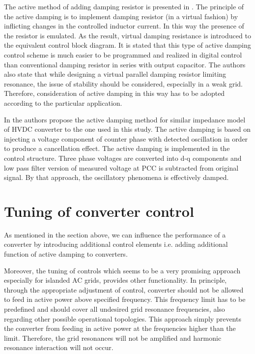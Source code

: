 \documentclass[a4paper,11pt,oneside]{report} %
\begin{document}
The active method of adding damping resistor is presented in \cite{chen2012}. The principle of the active damping is to implement damping resistor (in a virtual fashion) by inflicting changes in the controlled inductor current. In this way the presence of the resistor is emulated. As the result, virtual damping resistance is introduced to the equivalent control block diagram. It is stated that this type of active damping control scheme is much easier to be programmed and realized in digital control than conventional damping resistor in series with output capacitor. The authors also state that while designing a virtual parallel damping resistor limiting resonance, the issue of stability should be considered, especially in a weak grid. Therefore, consideration of active damping in this way has to be adopted according to the particular application.

In \cite{amin2015} the authors propose the active damping method for similar impedance model of HVDC converter to the one used in this study. The active damping \cite{amin2015} is based on injecting a voltage component of counter phase with detected oscillation in order to produce a cancellation effect. The active damping is implemented in the control structure. Three phase voltages are converted into d-q components and low pass filter version of measured voltage at PCC is subtracted from original signal. By that approach, the oscillatory phenomena is effectively damped.

\section{Tuning of converter control}
As mentioned in the section above, we can influence the performance of a converter by introducing additional control elements i.e. adding additional function of active damping to converters.

Moreover, the tuning of controls which seems to be a very promising approach especially for islanded AC grids, provides other functionality. In principle, through the appropriate adjustment of control, converter should not be allowed to feed in active power above specified frequency. This frequency limit has to be predefined and should cover all undesired grid resonance frequencies, also regarding other possible operational topologies. This approach simply prevents the converter from feeding in active power at the frequencies higher than the limit. Therefore, the grid resonances will not be amplified and harmonic resonance interaction will not occur.
\end{document}
